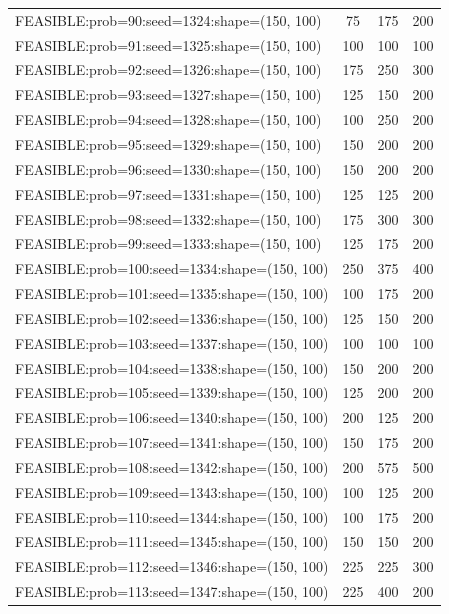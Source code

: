 \begin{longtable}{lccc}
FEASIBLE:prob=90:seed=1324:shape=(150, 100)  &   75 &   175 &    200 \\
FEASIBLE:prob=91:seed=1325:shape=(150, 100)  &  100 &   100 &    100 \\
FEASIBLE:prob=92:seed=1326:shape=(150, 100)  &  175 &   250 &    300 \\
FEASIBLE:prob=93:seed=1327:shape=(150, 100)  &  125 &   150 &    200 \\
FEASIBLE:prob=94:seed=1328:shape=(150, 100)  &  100 &   250 &    200 \\
FEASIBLE:prob=95:seed=1329:shape=(150, 100)  &  150 &   200 &    200 \\
FEASIBLE:prob=96:seed=1330:shape=(150, 100)  &  150 &   200 &    200 \\
FEASIBLE:prob=97:seed=1331:shape=(150, 100)  &  125 &   125 &    200 \\
FEASIBLE:prob=98:seed=1332:shape=(150, 100)  &  175 &   300 &    300 \\
FEASIBLE:prob=99:seed=1333:shape=(150, 100)  &  125 &   175 &    200 \\
FEASIBLE:prob=100:seed=1334:shape=(150, 100) &  250 &   375 &    400 \\
FEASIBLE:prob=101:seed=1335:shape=(150, 100) &  100 &   175 &    200 \\
FEASIBLE:prob=102:seed=1336:shape=(150, 100) &  125 &   150 &    200 \\
FEASIBLE:prob=103:seed=1337:shape=(150, 100) &  100 &   100 &    100 \\
FEASIBLE:prob=104:seed=1338:shape=(150, 100) &  150 &   200 &    200 \\
FEASIBLE:prob=105:seed=1339:shape=(150, 100) &  125 &   200 &    200 \\
FEASIBLE:prob=106:seed=1340:shape=(150, 100) &  200 &   125 &    200 \\
FEASIBLE:prob=107:seed=1341:shape=(150, 100) &  150 &   175 &    200 \\
FEASIBLE:prob=108:seed=1342:shape=(150, 100) &  200 &   575 &    500 \\
FEASIBLE:prob=109:seed=1343:shape=(150, 100) &  100 &   125 &    200 \\
FEASIBLE:prob=110:seed=1344:shape=(150, 100) &  100 &   175 &    200 \\
FEASIBLE:prob=111:seed=1345:shape=(150, 100) &  150 &   150 &    200 \\
FEASIBLE:prob=112:seed=1346:shape=(150, 100) &  225 &   225 &    300 \\
FEASIBLE:prob=113:seed=1347:shape=(150, 100) &  225 &   400 &    200 \\

\end{longtable}
